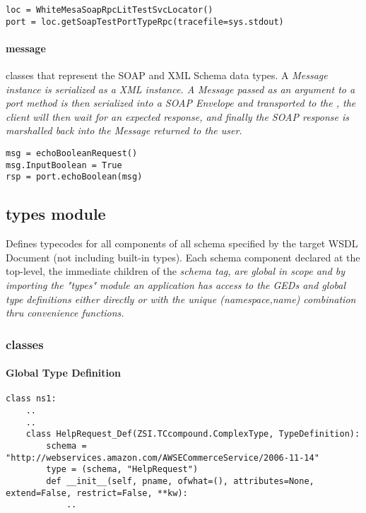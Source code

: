 \begin{verbatim}
loc = WhiteMesaSoapRpcLitTestSvcLocator()
port = loc.getSoapTestPortTypeRpc(tracefile=sys.stdout)
\end{verbatim}


\paragraph{message} classes that represent the SOAP and XML Schema
data types. A \it{Message} instance is serialized as a XML instance.  A
\it{Message} passed as an argument to a \it{port} method is then serialized into
a SOAP Envelope and transported to the \WS, the client will then wait for an
expected response, and finally the SOAP response is marshalled back into the
\it{Message} returned to the user.

\begin{verbatim}
msg = echoBooleanRequest()
msg.InputBoolean = True
rsp = port.echoBoolean(msg)
\end{verbatim}

\subsection{types module}
Defines typecodes for all components of all schema specified by the target WSDL
Document (not including built-in types).  Each schema component declared at the
top-level, the immediate children of the \it{schema} tag, are global in scope
and by importing the "types" module an application has access to the GEDs and
global type definitions either directly or with the unique
\it{(namespace,name)} combination thru convenience functions.

\subsubsection{classes}
\paragraph{Global Type Definition}
\begin{verbatim}
class ns1:
    ..
    ..
    class HelpRequest_Def(ZSI.TCcompound.ComplexType, TypeDefinition):
        schema = "http://webservices.amazon.com/AWSECommerceService/2006-11-14"
        type = (schema, "HelpRequest")
        def __init__(self, pname, ofwhat=(), attributes=None, extend=False, restrict=False, **kw):
            ..
\end{verbatim}
\par

